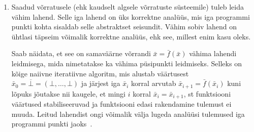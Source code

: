 \documentclass[../thesis.tex]{subfiles}
\begin{document}
\begin{enumerate}
	\item Saadud võrratusele (ehk kaudselt algsele võrratuste süsteemile) tuleb leida vähim lahend. Selle iga lahend on üks korrektne analüüs, mis iga programmi punkti kohta sisaldab selle abstraktset seisundit. Vähim sobiv lahend on ühtlasi täpseim võimalik korrektne analüüs, ehk see, millest enim kasu oleks.

	Saab näidata, et see on samaväärne võrrandi $\bar{x} = \bar{f}(\bar{x})$ vähima lahendi leidmisega, mida nimetatakse ka vähima püsipunkti leidmiseks. Selleks on kõige naiivne iteratiivne algoritm, mis alustab väärtusest $\bar{x}_0 = \overline{\bot} = (\bot, \ldots, \bot)$ ja järjest iga $\bar{x}_i$ korral arvutab $\bar{x}_{i+1} = \bar{f}(\bar{x}_i)$ kuni lõpuks jõutakse nii kaugele, et mingi $i$ korral $\bar{x}_i = \bar{x}_{i+1}$, st funktsiooni väärtused stabiliseeruvad ja funktsiooni edasi rakendamine tulemust ei muuda. Leitud lahendist ongi võimalik välja lugeda analüüsi tulemused iga programmi punkti jaoks~\cite[21]{seidl_foundations}.
\end{enumerate}
\end{document}

